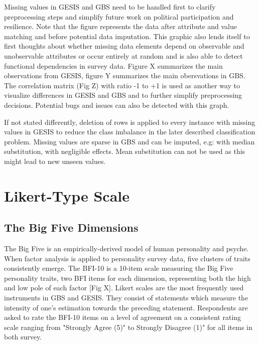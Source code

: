 Missing values in GESIS and GBS need to be handled first to clarify preprocessing steps and simplify future work on political participation and resilience. Note that the figure represents the data after attribute and value matching and before potential data imputation. This graphic also lends itself to first thoughts about whether missing data elements depend on observable and unobservable attributes or occur entirely at random and is also able to detect functional dependencies in survey data. Figure X summarizes the main observations from GESIS, figure Y summarizes the main obersvations in GBS. The correlation matrix (Fig Z) with ratio -1 to +1 is used as another way to visualize differences in GESIS and GBS and to further simplify preprocessing decisions. Potential bugs and issues can also be detected with this graph. 

If not stated differently, deletion of rows is applied to every instance with missing values in GESIS to reduce the class imbalance in the later described classification problem. Missing values are sparse in GBS and can be imputed, e.g: with median substitution, with negligible effects. Mean substitution can not be used as this might lead to new unseen values. 

\section{Likert-Type Scale}

\subsection{The Big Five Dimensions}

The Big Five is an empirically-derived model of human personality and psyche. When factor analysis is applied to personality survey data, five clusters of traits consistently emerge. The BFI-10 is a 10-item scale measuring the Big Five personality traits, two BFI items for each dimension, representing both the high and low pole of each factor [Fig X]. Likert scales are the most frequently used instruments in GBS and GESIS. They consist of statements which measure the intensity of one's estimation towards the preceding statement. Respondents are asked to rate the BFI-10 items on a level of agreement on a consistent rating scale ranging from "Strongly Agree (5)" to Strongly Disagree (1)" for all items in both survey.

